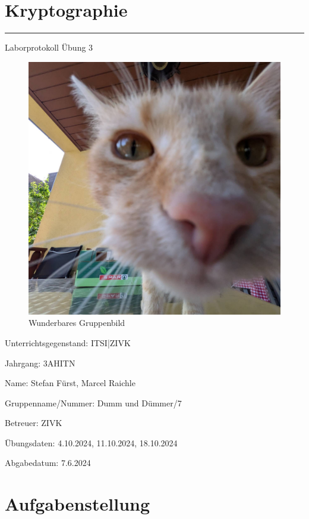 \documentclass[a4paper]{article}
\begin{document}

\pagestyle{oida}
\section*{Kryptographie}
\par\noindent\rule{\textwidth}{0.4pt}

Laborprotokoll
Übung 3

\begin{figure}[h]
	\includegraphics[scale=0.3]{images/mika.jpeg}
	\caption{Wunderbares Gruppenbild}
\end{figure}

\vspace*{\fill}
Unterrichtsgegenstand:	ITSI|ZIVK

Jahrgang:	3AHITN

Name:	Stefan Fürst, Marcel Raichle

Gruppenname/Nummer: Dumm und Dümmer/7

Betreuer: 	ZIVK

Übungsdaten:	4.10.2024, 11.10.2024, 18.10.2024

Abgabedatum:	7.6.2024


\newpage
\tableofcontents

\newpage

\section{Aufgabenstellung}
\end{document}
